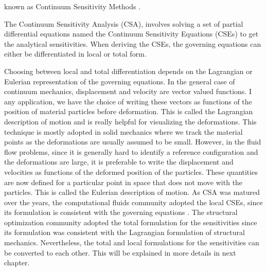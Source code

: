 known as Continuum Sensitivity Methods \cite{haftka1989recent}.

The Continuum Sensitivity Analysis (CSA), involves solving a set of partial differential equations named the Continuum Sensitivity Equations (CSEs) to get the analytical sensitivities. When deriving the CSEs, the governing equations can either be differentiated in local or total form.

Choosing between local and total differentiation depends on the Lagrangian or Eulerian representation of the governing equations. In the general case of continuum mechanics,  displacement and velocity are vector valued functions. I any application, we have the choice of writing these vectors as functions of the position of material particles before deformation. This is called the Lagrangian description of motion and is really helpful for visualizing the deformations. This technique is mostly adopted in solid mechanics where we track the material points as the deformations are usually assumed to be small. However, in the fluid flow problems, since it is generally hard to identify a reference configuration and the deformations are large, it is preferable to write the displacement and velocities as functions of the deformed position of the particles. These quantities are now defined for a particular point in space that does not move with the particles. This is called the Eulerian description of motion.  As CSA was matured over the years, the computational fluids community adopted the local CSEs, since its formulation is consistent with the governing equations \cite{borggaard1997pde, hristova2006continuous}. The structural optimization community adopted the total formulation for the sensitivities since its formulation was consistent with the Lagrangian formulation of structural mechanics. Nevertheless, the total and local formulations for the sensitivities can be converted to each other. This will be explained in more details in next chapter.

